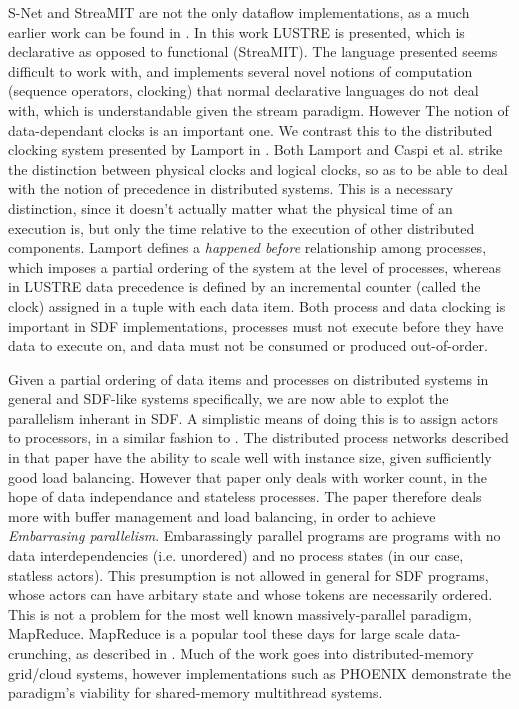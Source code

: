 S-Net and StreaMIT are not the only dataflow implementations, as a much earlier work can be found in \cite{cas87}.
In this work LUSTRE is presented, which is declarative as opposed to functional (StreaMIT).
The language presented seems difficult to work with, and implements several novel notions of computation (sequence operators, clocking) that normal declarative languages do not deal with, which is understandable given the stream paradigm.
However The notion of data-dependant clocks is an important one.
We contrast this to the distributed clocking system presented by Lamport in \cite{lam78}.
Both Lamport and Caspi et al. strike the distinction between physical clocks and logical clocks, so as to be able to deal with the notion of precedence in distributed systems.
This is a necessary distinction, since it doesn't actually matter what the physical time of an execution is, but only the time relative to the execution of other distributed components.
Lamport defines a {\em happened before} relationship among processes, which imposes a partial ordering of the system at the level of processes, whereas in LUSTRE data precedence is defined by an incremental counter (called the clock) assigned in a tuple with each data item.
Both process and data clocking is important in SDF implementations, processes must not execute before they have data to execute on, and data must not be consumed or produced out-of-order.

Given a partial ordering of data items and processes on distributed systems in general and SDF-like systems specifically, we are now able to explot the parallelism inherant in SDF.
A simplistic means of doing this is to assign actors to processors, in a similar fashion to \cite{par03}.
The distributed process networks described in that paper have the ability to scale well with instance size, given sufficiently good load balancing.
However that paper only deals with worker count, in the hope of data independance and stateless processes.
The paper therefore deals more with buffer management and load balancing, in order to achieve {\em Embarrasing parallelism}.
Embarassingly parallel programs are programs with no data interdependencies (i.e. unordered) and no process states (in our case, statless actors).
This presumption is not allowed in general for SDF programs, whose actors can have arbitary state and whose tokens are necessarily ordered.
This is not a problem for the most well known massively-parallel paradigm, MapReduce.
MapReduce is a popular tool these days for large scale data-crunching, as described in \cite{dea08}.
Much of the work goes into distributed-memory grid/cloud systems, however implementations such as PHOENIX \cite{ran07} demonstrate the paradigm's viability for shared-memory multithread systems.

